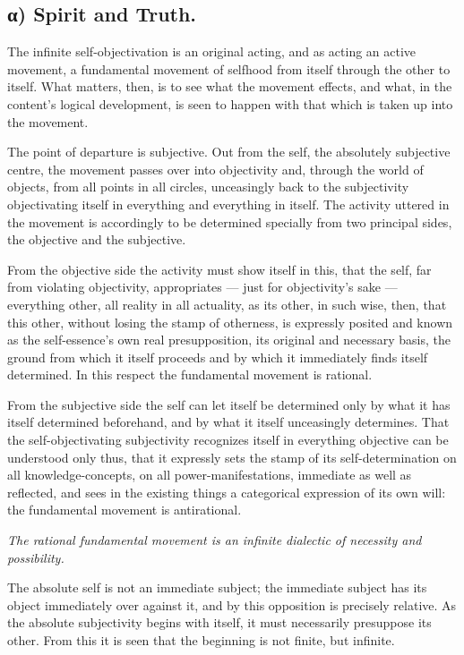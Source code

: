 \documentclass[12pt]{book}
\begin{document}
\subsection*{α) Spirit and Truth.}

The infinite self-objectivation is an original acting, and as acting
an active movement, a fundamental movement of selfhood from itself
through the other to itself. What matters, then, is to see what the
movement effects, and what, in the content's logical development, is
seen to happen with that which is taken up into the movement.

The point of departure is subjective. Out from the self, the
absolutely subjective centre, the movement passes over into
objectivity and, through the world of objects, from all points in
all circles, unceasingly back to the subjectivity objectivating
itself in everything and everything in itself. The activity uttered
in the movement is accordingly to be determined specially from two
principal sides, the objective and the subjective.

From the objective side the activity must show itself in this,
that the self, far from violating objectivity, appropriates --- just
for objectivity's sake --- everything other, all reality in all
actuality, as its other, in such wise, then, that this other,
without losing the stamp of otherness, is expressly posited and
known as the self-essence's own real presupposition, its original
and necessary basis, the ground from which it itself proceeds and by
which it immediately finds itself determined. In this respect the
fundamental movement is rational.

From the subjective side the self can let itself be determined only
by what it has itself determined beforehand, and by what it itself
unceasingly determines. That the self-objectivating subjectivity
recognizes itself in everything objective can be understood only
thus, that it expressly sets the stamp of its self-determination on
all knowledge-concepts, on all power-manifestations, immediate as
well as reflected, and sees in the existing things a categorical
expression of its own will: the fundamental movement is antirational.

\emph{The rational fundamental movement is an infinite dialectic of
necessity and possibility.}

The absolute self is not an immediate subject; the immediate subject
has its object immediately over against it, and by this opposition
is precisely relative. As the absolute subjectivity begins with
itself, it must necessarily presuppose its other. From this it is
seen that the beginning is not finite, but infinite.
\end{document}
